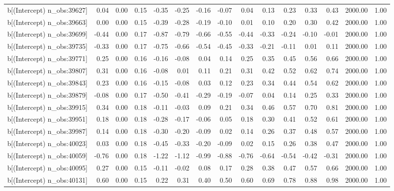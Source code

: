 \begin{table}[ht]
\begin{tabular}{rrrrrrrrrrrrrrr}
  b[(Intercept) n\_obs:39627] & 0.04 & 0.00 & 0.15 & -0.35 & -0.25 & -0.16 & -0.07 & 0.04 & 0.13 & 0.23 & 0.33 & 0.43 & 2000.00 & 1.00 \\ 
  b[(Intercept) n\_obs:39663] & 0.00 & 0.00 & 0.15 & -0.39 & -0.28 & -0.19 & -0.10 & 0.01 & 0.10 & 0.20 & 0.30 & 0.42 & 2000.00 & 1.00 \\ 
  b[(Intercept) n\_obs:39699] & -0.44 & 0.00 & 0.17 & -0.87 & -0.79 & -0.66 & -0.55 & -0.44 & -0.33 & -0.24 & -0.10 & -0.01 & 2000.00 & 1.00 \\ 
  b[(Intercept) n\_obs:39735] & -0.33 & 0.00 & 0.17 & -0.75 & -0.66 & -0.54 & -0.45 & -0.33 & -0.21 & -0.11 & 0.01 & 0.11 & 2000.00 & 1.00 \\ 
  b[(Intercept) n\_obs:39771] & 0.25 & 0.00 & 0.16 & -0.16 & -0.08 & 0.04 & 0.14 & 0.25 & 0.35 & 0.45 & 0.56 & 0.66 & 2000.00 & 1.00 \\ 
  b[(Intercept) n\_obs:39807] & 0.31 & 0.00 & 0.16 & -0.08 & 0.01 & 0.11 & 0.21 & 0.31 & 0.42 & 0.52 & 0.62 & 0.74 & 2000.00 & 1.00 \\ 
  b[(Intercept) n\_obs:39843] & 0.23 & 0.00 & 0.16 & -0.15 & -0.08 & 0.03 & 0.12 & 0.23 & 0.34 & 0.44 & 0.54 & 0.62 & 2000.00 & 1.00 \\ 
  b[(Intercept) n\_obs:39879] & -0.08 & 0.00 & 0.17 & -0.50 & -0.41 & -0.29 & -0.19 & -0.07 & 0.04 & 0.14 & 0.25 & 0.33 & 2000.00 & 1.00 \\ 
  b[(Intercept) n\_obs:39915] & 0.34 & 0.00 & 0.18 & -0.11 & -0.03 & 0.09 & 0.21 & 0.34 & 0.46 & 0.57 & 0.70 & 0.81 & 2000.00 & 1.00 \\ 
  b[(Intercept) n\_obs:39951] & 0.18 & 0.00 & 0.18 & -0.28 & -0.17 & -0.06 & 0.05 & 0.18 & 0.30 & 0.41 & 0.52 & 0.61 & 2000.00 & 1.00 \\ 
  b[(Intercept) n\_obs:39987] & 0.14 & 0.00 & 0.18 & -0.30 & -0.20 & -0.09 & 0.02 & 0.14 & 0.26 & 0.37 & 0.48 & 0.57 & 2000.00 & 1.00 \\ 
  b[(Intercept) n\_obs:40023] & 0.03 & 0.00 & 0.18 & -0.45 & -0.33 & -0.20 & -0.09 & 0.02 & 0.15 & 0.26 & 0.38 & 0.47 & 2000.00 & 1.00 \\ 
  b[(Intercept) n\_obs:40059] & -0.76 & 0.00 & 0.18 & -1.22 & -1.12 & -0.99 & -0.88 & -0.76 & -0.64 & -0.54 & -0.42 & -0.31 & 2000.00 & 1.00 \\ 
  b[(Intercept) n\_obs:40095] & 0.27 & 0.00 & 0.15 & -0.11 & -0.02 & 0.08 & 0.17 & 0.28 & 0.38 & 0.47 & 0.57 & 0.66 & 2000.00 & 1.00 \\ 
  b[(Intercept) n\_obs:40131] & 0.60 & 0.00 & 0.15 & 0.22 & 0.31 & 0.40 & 0.50 & 0.60 & 0.69 & 0.78 & 0.88 & 0.98 & 2000.00 & 1.00 \\ 

\end{tabular}
\end{table}
